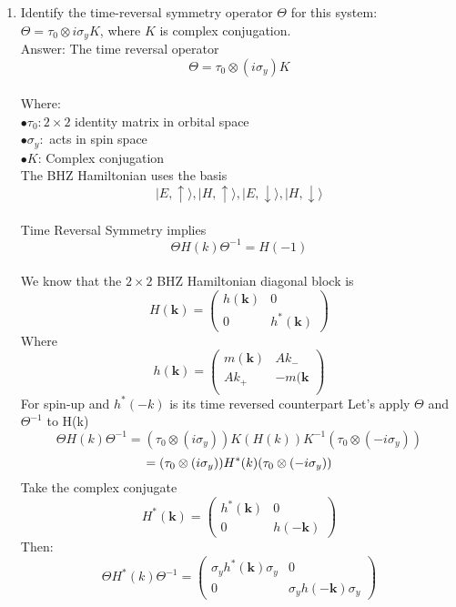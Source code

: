 \documentclass[a4paper,12pt]{article}
\begin{document}
\begin{enumerate}
    \item Identify the time-reversal symmetry operator $\Theta$ for this system: $\Theta = \tau_0 \otimes i\sigma_y K$, where $K$ is complex conjugation.\\
Answer: The time reversal operator\\
\[
\Theta = \tau_0\otimes({i\sigma_y})K
\]\\
Where:\\
$\bullet \tau_0: 2\times2$ identity matrix in orbital space\\
$\bullet \sigma_y:$ acts in spin space\\
$\bullet{K}$: Complex conjugation\\
The BHZ Hamiltonian uses the basis\\
\[\vert E, \uparrow \rangle, \vert H, \uparrow \rangle, \vert E, \downarrow \rangle, \vert H, \downarrow \rangle\]\\
Time Reversal Symmetry implies
\[\Theta H({k})\Theta^{-1} = H({-1})
\]\\
We know that the $2\times2$ BHZ Hamiltonian diagonal block is\\
\[ H(\mathbf{k}) = \begin{pmatrix}
h(\mathbf{k}) & 0\\
0 & h^\ast(\mathbf{k})
\end{pmatrix}\]
Where\\
\[ h(\mathbf{k}) = \begin{pmatrix}
 m(\mathbf{k}) & A k_- \\
 A k_+ & -m(\mathbf{k} \\
\end{pmatrix}\]
For spin-up and $h^{\ast}(-k)$ is its time reversed counterpart
Let's apply $\Theta$ and $\Theta^{-1}$ to H(k)\\
\[ \Theta H(k)\Theta^{-1} = (\tau_0\otimes({i\sigma_y}))K (H(k)) K^{-1} (\tau_0\otimes(-{i\sigma_y}) )
\]
\[= (\tau_0\otimes({i\sigma_y})) H^{\ast}(k) (\tau_0\otimes(-{i\sigma_y}))\\ \]
Take the complex conjugate\\
\[ H^{\ast}(\mathbf{k}) = \begin{pmatrix}
h^{\ast}(\mathbf{k}) & 0\\
0 & h(-\mathbf{k})
\end{pmatrix}\]
Then:\\
\[\Theta H^{\ast}(k)\Theta^{-1} = \begin{pmatrix}
\sigma_{y} h^{\ast}(\mathbf{k}) \sigma_{y} & 0\\
0 & \sigma_{y }h(-\mathbf{k}) \sigma_{y}

\end{pmatrix}\]
\end{enumerate}
\end{document}
